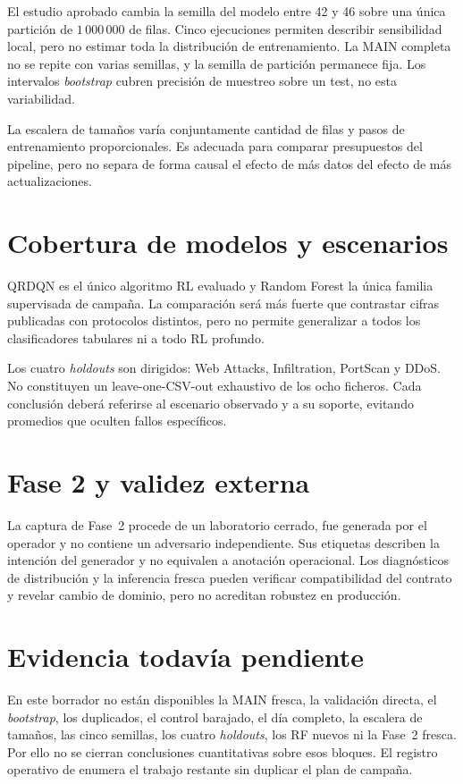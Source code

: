 El estudio aprobado cambia la semilla del modelo entre 42 y 46 sobre una única partición de $1\,000\,000$ de filas. Cinco ejecuciones permiten describir sensibilidad local, pero no estimar toda la distribución de entrenamiento. La MAIN completa no se repite con varias semillas, y la semilla de partición permanece fija. Los intervalos \emph{bootstrap} cubren precisión de muestreo sobre un test, no esta variabilidad.

La escalera de tamaños varía conjuntamente cantidad de filas y pasos de entrenamiento proporcionales. Es adecuada para comparar presupuestos del pipeline, pero no separa de forma causal el efecto de más datos del efecto de más actualizaciones.

\section{Cobertura de modelos y escenarios}

QRDQN es el único algoritmo RL evaluado y Random Forest la única familia supervisada de campaña. La comparación será más fuerte que contrastar cifras publicadas con protocolos distintos, pero no permite generalizar a todos los clasificadores tabulares ni a todo RL profundo.

Los cuatro \emph{holdouts} son dirigidos: Web Attacks, Infiltration, PortScan y DDoS. No constituyen un leave-one-CSV-out exhaustivo de los ocho ficheros. Cada conclusión deberá referirse al escenario observado y a su soporte, evitando promedios que oculten fallos específicos.

\section{Fase 2 y validez externa}

La captura de Fase~2 procede de un laboratorio cerrado, fue generada por el operador y no contiene un adversario independiente. Sus etiquetas describen la intención del generador y no equivalen a anotación operacional. Los diagnósticos de distribución y la inferencia fresca pueden verificar compatibilidad del contrato y revelar cambio de dominio, pero no acreditan robustez en producción.

\section{Evidencia todavía pendiente}

En este borrador no están disponibles la MAIN fresca, la validación directa, el \emph{bootstrap}, los duplicados, el control barajado, el día completo, la escalera de tamaños, las cinco semillas, los cuatro \emph{holdouts}, los RF nuevos ni la Fase~2 fresca. Por ello no se cierran conclusiones cuantitativas sobre esos bloques. El registro operativo de  enumera el trabajo restante sin duplicar el plan de campaña.

